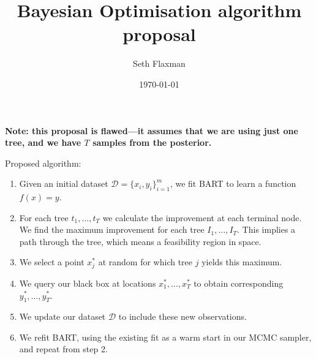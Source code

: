 \documentclass[12pt]{article}
\title{Bayesian Optimisation algorithm proposal}
\date{\today}
\author{Seth Flaxman}
\begin{document}
\maketitle 
{\bf Note: this proposal is flawed---it assumes that we are using just one tree, and we have $T$ samples from the posterior.}

Proposed algorithm:

\begin{enumerate}
\item Given an initial dataset $\mathcal{D} = \{x_i,y_i\}_{i=1}^m$, we fit BART to learn a function $f(x) = y$.
\item For each tree $t_1, \ldots, t_T$ we calculate the improvement at each terminal node. We find the maximum improvement 
for each tree $I_1, \ldots, I_T$. This implies a path through the tree, which means a feasibility region in space.
\item We select a point $x_j^*$ at random for which tree $j$ yields this maximum. 
\item We query our black box at locations $x_1^*, \ldots, x_T^*$ to obtain corresponding $y_1^*, \ldots, y_T^*$.
\item We update our dataset $\mathcal{D}$ to include these new observations.
\item We refit BART, using the existing fit as a warm start in our MCMC sampler, and repeat from step 2.
\end{enumerate}
\end{document}
